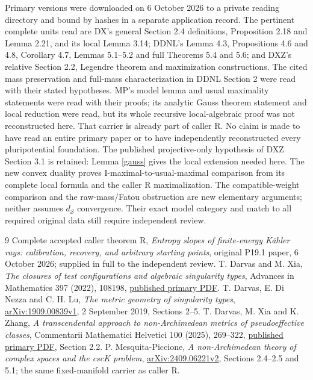 \documentclass[11pt]{article}
\begin{document}
Primary versions were downloaded on 6 October 2026 to a private
reading directory and bound by hashes in a separate application
record. The pertinent complete units read are DX's general
Section 2.4 definitions, Proposition 2.18 and Lemma 2.21, and
its local Lemma 3.14; DDNL's Lemma 4.3, Propositions 4.6 and 4.8,
Corollary 4.7, Lemmas 5.1--5.2 and full Theorems 5.4 and 5.6;
and DXZ's relative
Section 2.2, Legendre theorem and maximization constructions.
The cited mass preservation and full-mass characterization in
DDNL Section 2 were read with their stated hypotheses. MP's
model lemma and usual maximality statements were read with their
proofs; its analytic Gauss theorem statement and local reduction
were read, but its whole recursive local-algebraic proof was not
reconstructed here. That carrier is already part of caller R.
No claim is made to have read an entire primary paper or to have
independently reconstructed every pluripotential foundation.
The published projective-only hypothesis of DXZ Section 3.1 is
retained: Lemma \ref{gauss} gives the local extension needed here.
The new convex duality proves I-maximal-to-usual-maximal comparison
from its complete local formula and the caller R maximalization.
The compatible-weight comparison and the raw-mass/Fatou obstruction
are new elementary arguments; neither assumes $d_{\mathcal S}$
convergence. Their exact model category and match to all required
original data still require independent review.

\begin{thebibliography}{9}
 Complete accepted caller theorem R,
\emph{Entropy slopes of finite-energy K\"ahler rays: calibration,
recovery, and arbitrary starting points}, original P19.1 paper,
6 October 2026; supplied in full to the independent review.
 T. Darvas and M. Xia, \emph{The closures of test
configurations and algebraic singularity types}, Advances in
Mathematics 397 (2022), 108198,
\href{https://research.chalmers.se/publication/528300/file/528300_Fulltext.pdf}{published primary PDF}.
 T. Darvas, E. Di Nezza and C. H. Lu,
\emph{The metric geometry of singularity types},
\href{https://arxiv.org/pdf/1909.00839v1}{arXiv:1909.00839v1},
2 September 2019, Sections 2--5.
 T. Darvas, M. Xia and K. Zhang,
\emph{A transcendental approach to non-Archimedean metrics of
pseudoeffective classes}, Commentarii Mathematici Helvetici 100
(2025), 269--322,
\href{https://ems.press/content/serial-article-files/49836}{published primary PDF}, Section 2.2.
 P. Mesquita-Piccione,
\emph{A non-Archimedean theory of complex spaces and the cscK problem},
\href{https://arxiv.org/pdf/2409.06221v2}{arXiv:2409.06221v2},
Sections 2.4--2.5 and 5.1; the same fixed-manifold carrier as caller R.
\end{thebibliography}
\end{document}
